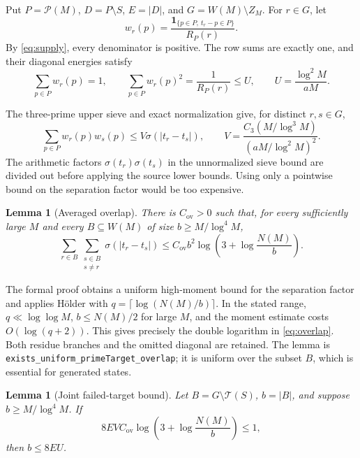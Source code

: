 \documentclass[11pt]{article}
\newtheorem{lemma}[theorem]{Lemma}
\theoremstyle{definition}
\theoremstyle{remark}
\newcommand{\PP}{\mathcal P}
\newcommand{\cT}{\mathcal T}
\newcommand{\sig}{\sigma}
\newcommand{\card}[1]{\lvert #1\rvert}
\newcommand{\lean}[1]{\nolinkurl{#1}}
\begin{document}
Put \(P=\PP(M)\), \(D=P\setminus S\), \(E=\card D\), and
\(G=W(M)\setminus Z_M\). For \(r\in G\), let
\[
 w_r(p)=\frac{\mathbf1_{\{p\in P,\ t_r-p\in P\}}}{R_P(r)}.
\]
By \eqref{eq:supply}, every denominator is positive. The row sums
are exactly one, and their diagonal energies satisfy
\begin{equation}\label{eq:self}
 \sum_{p\in P}w_r(p)=1,\qquad
 \sum_{p\in P}w_r(p)^2=\frac1{R_P(r)}
       \le U,\qquad U=\frac{\log^2M}{aM}.
\end{equation}

The three-prime upper sieve and exact normalization give, for distinct
\(r,s\in G\),
\begin{equation}\label{eq:cross}
 \sum_{p\in P}w_r(p)w_s(p)
 \le V\sig(|t_r-t_s|),\qquad
 V=\frac{C_3(M/\log^3M)}{(aM/\log^2M)^2}.
\end{equation}
The arithmetic factors \(\sig(t_r)\sig(t_s)\) in the unnormalized
sieve bound are divided out before applying the source lower bounds.
Using only a pointwise bound on the separation factor would be too
expensive.

\begin{lemma}[Averaged overlap]\label{lem:overlap}
There is \(C_{\mathrm{ov}}>0\) such that, for every sufficiently
large \(M\) and every \(B\subseteq W(M)\) of size
\(b\ge M/\log^4M\),
\begin{equation}\label{eq:overlap}
 \sum_{r\in B}\sum_{\substack{s\in B\\s\ne r}}
       \sig(|t_r-t_s|)
 \le C_{\mathrm{ov}}b^2
       \log\!\left(3+\log\frac{N(M)}b\right).
\end{equation}
\end{lemma}

The formal proof obtains a uniform high-moment bound for the
separation factor and applies H\"older with
\(q=\lceil\log(N(M)/b)\rceil\). In the stated range,
\(q\ll\log\log M\), \(b\le N(M)/2\) for large \(M\), and the
moment estimate costs \(O(\log(q+2))\). This gives precisely the
double logarithm in \eqref{eq:overlap}. Both residue branches and
the omitted diagonal are retained. The lemma is
\lean{exists_uniform_primeTarget_overlap}; it is uniform over
the subset \(B\), which is essential for generated states.

\begin{lemma}[Joint failed-target bound]\label{lem:joint}
Let \(B=G\setminus\cT(S)\), \(b=\card B\), and suppose
\(b\ge M/\log^4M\). If
\begin{equation}\label{eq:absorb}
 8EVC_{\mathrm{ov}}\log\!\left(3+\log\frac{N(M)}b\right)\le1,
\end{equation}
then \(b\le8EU\).
\end{lemma}
\end{document}
